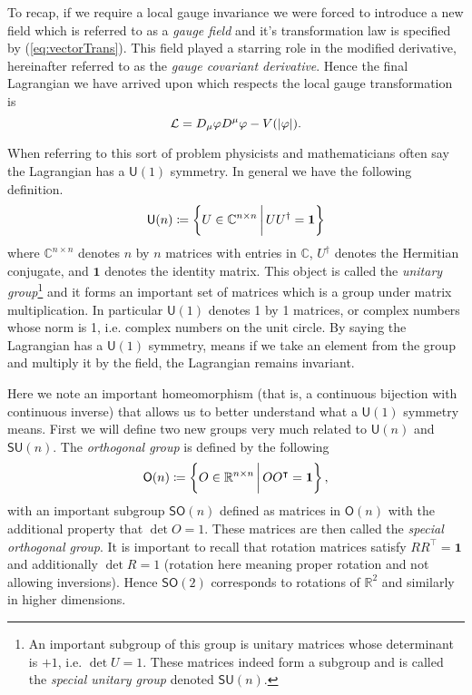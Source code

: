 To recap, if we require a local gauge invariance we were forced to introduce a new field which is referred to as a \textit{gauge field} and it's transformation law is specified by (\ref{eq:vectorTrans}). This field played a starring role in the modified derivative, hereinafter referred to as the \textit{gauge covariant derivative}. Hence the final Lagrangian we have arrived upon which respects the local gauge transformation is
\begin{equation}\label{eq:covLag}
\mathcal{L} = D_\mu\varphi D^\mu\varphi - V(|\varphi|).
\end{equation}

When referring to this sort of problem physicists and mathematicians often say the Lagrangian has a $\mathsf{U}(1)$ symmetry. In general we have the following definition.
\begin{equation}\label{eq:unitaryG}
\mathsf{U}(n)\coloneqq\left\{U\in\mathbb{C}^{n\times n} \, \bigg{|} \, UU^\dagger = \mathbf{1}\right\}
\end{equation}
where $\mathbb{C}^{n\times n}$ denotes $n$ by $n$ matrices with entries in $\mathbb{C}$, $U^\dagger$ denotes the Hermitian conjugate, and $\mathbf{1}$ denotes the identity matrix. This object is called the \textit{unitary group}\footnote{An important subgroup of this group is unitary matrices whose determinant is $+1$, i.e. $\det U = 1$. These matrices indeed form a subgroup and is called the \textit{special unitary group} denoted $\mathsf{SU}(n)$.} and it forms an important set of matrices which is a group under matrix multiplication. In particular $\mathsf{U}(1)$ denotes 1 by 1 matrices, or complex numbers whose norm is 1, i.e. complex numbers on the unit circle. By saying the Lagrangian has a $\mathsf{U}(1)$ symmetry, means if we take an element from the group and multiply it by the field, the Lagrangian remains invariant.

Here we note an important homeomorphism (that is, a continuous bijection with continuous inverse) that allows us to better understand what a $\mathsf{U}(1)$ symmetry means. First we will define two new groups very much related to $\mathsf{U}(n)$ and $\mathsf{SU}(n)$. The \textit{orthogonal group} is defined by the following
\begin{equation}
\mathsf{O}(n)\coloneqq\left\{O\in\mathbb{R}^{n\times n}\,\bigg{|}\,OO^\intercal = \mathbf{1}\right\},
\end{equation}
with an important subgroup $\mathsf{SO}(n)$ defined as matrices in $\mathsf{O}(n)$ with the additional property that $\det O = 1$. These matrices are then called the \textit{special orthogonal group}. It is important to recall that rotation matrices satisfy $RR^{\intercal} = \mathbf{1}$ and additionally $\det R = 1$ (rotation here meaning proper rotation and not allowing inversions). Hence $\mathsf{SO}(2)$ corresponds to rotations of $\mathbb{R}^2$ and similarly in higher dimensions.

